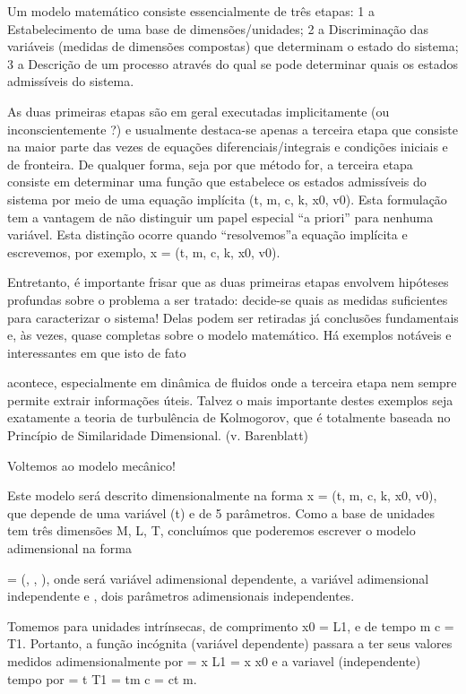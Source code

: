 Um modelo matemático consiste essencialmente de três etapas:
1 a Estabelecimento de uma base de dimensões/unidades;
2 a Discriminação das variáveis (medidas de dimensões compostas) que determinam o estado do sistema;
3 a Descrição de um processo através do qual se pode determinar quais os estados admissíveis do sistema.

As duas primeiras etapas são em geral executadas implicitamente (ou inconscientemente ?) e usualmente destaca-se apenas a terceira etapa que consiste na maior parte das vezes de equações diferenciais/integrais e condições iniciais e de fronteira. De qualquer forma, seja por que método for, a terceira etapa consiste em determinar uma função \Phi que estabelece os estados admissíveis do sistema por meio de uma equação implícita \Psi(t, m, c, k, x0, v0). Esta formulação tem a vantagem de não distinguir um papel especial “a priori” para nenhuma variável. Esta distinção ocorre quando “resolvemos”a equação implícita e escrevemos, por exemplo, x = \Psi(t, m, c, k, x0, v0).

Entretanto, é importante frisar que as duas primeiras etapas envolvem hipóteses profundas sobre o problema a ser tratado: decide-se quais as medidas suficientes para caracterizar o sistema! Delas podem ser retiradas já conclusões fundamentais e, às vezes, quase completas sobre o modelo matemático. Há exemplos notáveis e interessantes em que isto de fato

acontece, especialmente em dinâmica de fluidos onde a terceira etapa nem sempre permite extrair informações úteis. Talvez o mais importante destes exemplos seja exatamente a teoria de turbulência de Kolmogorov, que é totalmente baseada no Princípio de Similaridade Dimensional. (v. Barenblatt)

Voltemos ao modelo mecânico!

Este modelo será descrito dimensionalmente na forma x = \Psi(t, m, c, k, x0, v0), que depende de uma variável (t) e de 5 parâmetros. Como a base de unidades tem três dimensões {M, L, T}, concluímos que poderemos escrever o modelo adimensional na forma

\eta = \Phi(\tau, , \mu), onde \eta será variável adimensional dependente, \tau a variável adimensional independente e \mu,  dois parâmetros adimensionais independentes.

Tomemos para unidades intrínsecas, de comprimento x0 = L1, e de tempo m c = T1. Portanto, a função incógnita (variável dependente) passara a ter seus valores medidos adimensionalmente por \eta =
x
L1
=
x
x0
e a variavel (independente) tempo por \tau =
t
T1
=
tm
c
=
ct
m.

